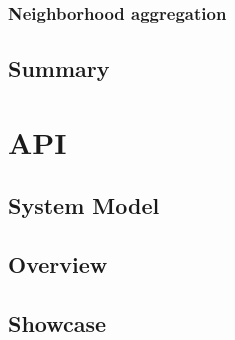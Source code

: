 \subsubsection{Neighborhood aggregation}

\subsection{Summary}

\section{API}

\subsection{System Model}

\subsection{Overview}

\subsection{Showcase}